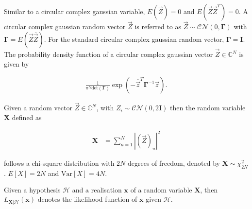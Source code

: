 \documentclass[a4paper, openany, oneside]{memoir}
\begin{document}
Similar to a circular complex gaussian variable, $E(\vec{Z}) = 0$
and $E(\vec{Z}\vec{Z}^T) = 0$. A circular complex gaussian random vector $\vec{Z}$ is referred to as $\vec{Z} \sim \mathcal{CN}(0,\mathbf{\Gamma})$ with $\mathbf{\Gamma} = E(\vec{Z}\overline{\vec{Z}} )$. For the standard circular complex gaussian random vector, $\mathbf{\Gamma} = \mathbf{I}$. The probability density function of a circular complex gaussian vector $\vec{Z}\in \mathbb{C}^N$ is given by

\begin{align*}
    \frac{1}{\pi^N \text{det}(\mathbf{\Gamma})} \exp \left(-\overline{\vec{z}}^T \mathbf{\Gamma}^{-1}\vec{z}\right).
\end{align*}

\begin{blockDefinition}
Given a random vector $\vec{Z} \in \mathbb{C}^N$, with $Z_i \sim \mathcal{CN}(0, 2\mathbf{I})$ then the random variable $\mathbf{X}$ defined as

\begin{align*}
	\mathbf{X} &= \sum_{n=1}^N \left|(\vec{Z})_n\right|^2 %
\end{align*}






follows a chi-square distribution with $2N$ degrees of freedom, denoted by $\mathbf{X} \sim \chi^2_{2N}$.
$E[X] = 2N$ and $\text{Var}[X] = 4N$.
\end{blockDefinition}

\begin{blockDefinition}
Given a hypothesis $\mathcal{H}$ and a realisation $\mathbf{x}$ of a random variable $\mathbf{X}$, then $L_{\mathbf{X} | \mathcal{H}}(\mathbf{x})$ denotes the likelihood function of $\mathbf{x}$ given $\mathcal{H}$.
\end{blockDefinition}
\end{document}
